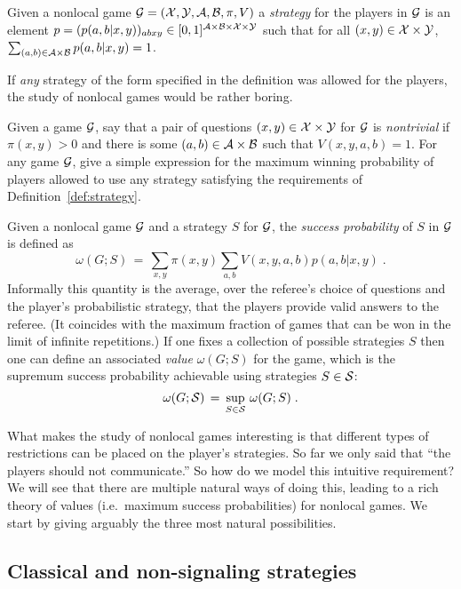 \begin{definition}[Strategy]\label{def:strategy}
Given a nonlocal game $\mathcal{G}=(\mathcal{X},\mathcal{Y},\mathcal{A},\mathcal{B},\pi,V)$ a \emph{strategy} for the players in $\mathcal{G}$ is an element $p=(p(a,b|x,y))_{abxy} \in [0,1]^{\mathcal{A}\times \mathcal{B}\times \mathcal{X}\times \mathcal{Y}}$ such that for all $(x,y)\in\mathcal{X}\times \mathcal{Y}$, $\sum_{(a,b)\in\mathcal{A}\times \mathcal{B}} p(a,b|x,y) = 1$. 
\end{definition}

If \emph{any} strategy of the form specified in the definition was allowed for the players, the study of nonlocal games would be rather boring. 

\begin{exercise}\label{ex:nontrivial}
Given a game $\mathcal{G}$, say that a pair of questions $(x,y)\in\mathcal{X}\times \mathcal{Y}$ for $\mathcal{G}$ is \emph{nontrivial} if $\pi(x,y)>0$ and there is some $(a,b)\in \mathcal{A}\times \mathcal{B}$ such that $V(x,y,a,b)=1$.
For any game $\mathcal{G}$, give a simple expression for the maximum winning probability of players allowed to  use any strategy satisfying the requirements of Definition~\ref{def:strategy}.
\end{exercise}

Given a nonlocal game $\mathcal{G}$ and a strategy $S$ for $\mathcal{G}$, the \emph{success probability} of $S$ in $\mathcal{G}$ is defined as 
\[ \omega(G;S) \,=\, \sum_{x,y} \pi(x,y) \sum_{a,b} V(x,y,a,b) p(a,b|x,y)\;.\]
Informally this quantity is the average, over the referee's choice of questions and the player's probabilistic strategy, that the players provide valid answers to the referee. (It coincides with the maximum fraction of games that can be won in the limit of infinite repetitions.) 
If one fixes a collection of possible strategies $S$ then one can define an associated \emph{value} $\omega(G;S)$ for the game, which is the supremum success probability achievable using strategies $S\in\mathcal{S}$:
\[ \omega(G;\mathcal{S}) \,=\, \sup_{S\in\mathcal{S}} \,\omega(G;S)\;.\]





What makes the study of nonlocal games interesting is that different types of restrictions can be placed on the player's strategies. So far we only said that ``the players should not communicate.'' 
So how do we model this intuitive requirement?
We will see that there are multiple natural ways of doing this, leading to a rich theory of values (i.e.\ maximum success probabilities) for nonlocal games. We start by giving arguably the three most natural possibilities.

\subsection{Classical and non-signaling strategies}
\label{sec:strat}

